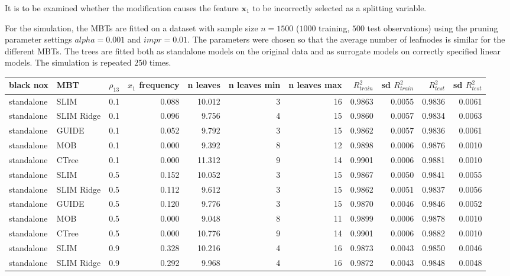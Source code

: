               
It is to be examined whether the modification causes the feature $\textbf{x}_1$ to be incorrectly selected as a splitting variable.


For the simulation, the MBTs are fitted on a dataset with sample size $ n = 1500$ ($1000$ training, $500$ test observations) using the pruning parameter settings $alpha = 0.001$ and $impr = 0.01$. The parameters were chosen so that the average number of leafnodes is similar for the different MBTs. The trees are fitted both as standalone models on the original data and as surrogate models on correctly specified linear models. The simulation is repeated $250$ times.


\begin{table}[!htb]
\centering \tiny
\begin{tabular}[t]{l|l|r|r|r|r|r|r|r|r|r}
\hline
black nox & MBT & $\rho_{13}$ & $x_1$ frequency & n leaves & n leaves min & n leaves max & $R^2_{train}$  & sd $R^2_{train}$ & $R^2_{test}$ & sd $R^2_{test}$ \\
\hline
standalone & SLIM & 0.1 & 0.088 & 10.012 & 3 & 16 & 0.9863 & 0.0055 & 0.9836 & 0.0061\\
standalone & SLIM Ridge & 0.1 & 0.096 & 9.756 & 4 & 15 & 0.9860 & 0.0057 & 0.9834 & 0.0063\\
standalone & GUIDE & 0.1 & 0.052 & 9.792 & 3 & 15 & 0.9862 & 0.0057 & 0.9836 & 0.0061\\
standalone & MOB & 0.1 & 0.000 & 9.392 & 8 & 12 & 0.9898 & 0.0006 & 0.9876 & 0.0010\\
standalone & CTree & 0.1 & 0.000 & 11.312 & 9 & 14 & 0.9901 & 0.0006 & 0.9881 & 0.0010\\
\hline
standalone & SLIM & 0.5 & 0.152 & 10.052 & 3 & 15 & 0.9867 & 0.0050 & 0.9841 & 0.0055\\
standalone & SLIM Ridge & 0.5 & 0.112 & 9.612 & 3 & 15 & 0.9862 & 0.0051 & 0.9837 & 0.0056\\
standalone & GUIDE & 0.5 & 0.120 & 9.776 & 3 & 15 & 0.9870 & 0.0046 & 0.9846 & 0.0052\\
standalone & MOB & 0.5 & 0.000 & 9.048 & 8 & 11 & 0.9899 & 0.0006 & 0.9878 & 0.0010\\
standalone & CTree & 0.5 & 0.000 & 10.776 & 9 & 14 & 0.9901 & 0.0006 & 0.9882 & 0.0010\\
\hline
standalone & SLIM & 0.9 & 0.328 & 10.216 & 4 & 16 & 0.9873 & 0.0043 & 0.9850 & 0.0046\\
standalone & SLIM Ridge & 0.9 & 0.292 & 9.968 & 4 & 16 & 0.9872 & 0.0043 & 0.9848 & 0.0048\\

\end{tabular}
\end{table}

